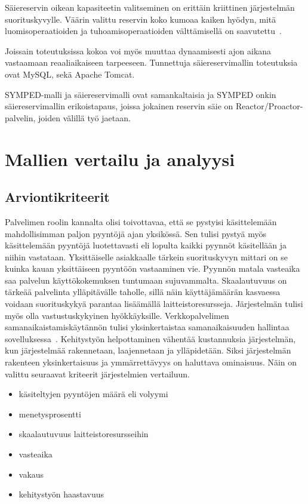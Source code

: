 \documentclass[finnish]{tktltiki2}
\theoremstyle{definition}
\theoremstyle{remark}
\begin{document}
Säiereservin oikean kapasiteetin valitseminen on erittäin kriittinen
järjestelmän suorituskyvylle.
Väärin valittu reservin koko kumoaa kaiken hyödyn, mitä luomisoperaatioiden
ja tuhoamisoperaatioiden välttämisellä on saavutettu~\cite{ling_analysis_2000}.

Joissain toteutuksissa kokoa voi myös muuttaa dynaamisesti ajon aikana vastaamaan
reaaliaikaiseen tarpeeseen.
Tunnettuja säiereservimallin toteutuksia ovat MySQL, sekä Apache Tomcat.

SYMPED-malli ja säiereservimalli ovat samankaltaisia ja SYMPED onkin 
säiereservimallin erikoistapaus, joissa jokainen reservin säie on Reactor/Proactor-palvelin,
joiden välillä työ jaetaan. 

\section{Mallien vertailu ja analyysi}
\subsection{Arviontikriteerit}
Palvelimen roolin kannalta olisi toivottavaa, että
se pystyisi käsittelemään mahdollisimman paljon pyyntöjä
ajan yksikössä. Sen tulisi pystyä myös käsittelemään pyyntöjä
luotettavasti eli lopulta kaikki pyynnöt käsitellään ja niihin vastataan.
Yksittäiselle asiakkaalle tärkein suorituskyvyn mittari on se kuinka kauan
yksittäiseen pyyntöön vastaaminen vie. Pyynnön matala vasteaika saa
palvelun käyttökokemuksen tuntumaan sujuvammalta.
Skaalautuvuus on tärkeää palvelinta ylläpitävälle taholle, sillä
näin käyttäjämäärän kasvaessa voidaan suorituskykyä parantaa
lisäämällä laitteistoresursseja. Järjestelmän tulisi myös
olla vastustuskykyinen hyökkäyksille.
Verkkopalvelimen samanaikaistamiskäytännön tulisi
yksinkertaistaa samanaikaisuuden hallintaa sovelluksessa~\cite{pyarali_proactor_1997}.
Kehitystyön helpottaminen vähentää kustannuksia
järjestelmän, kun järjestelmää rakennetaan, laajennetaan ja ylläpidetään.
Siksi järjestelmän rakenteen yksinkertaisuus ja
ymmärrettävyys on haluttava ominaisuus.
Näin on valittu seuraavat kriteerit 
järjestelmien vertailuun.
\begin{itemize}
    \item käsiteltyjen pyyntöjen määrä eli volyymi
    \item menetysprosentti
    \item skaalautuvuus laitteistoresursseihin
    \item vasteaika
    \item vakaus
    \item kehitystyön haastavuus
\end{itemize}
\end{document}
